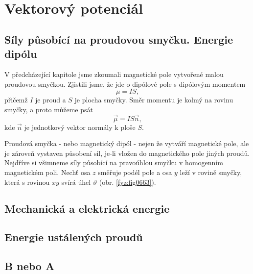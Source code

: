 \setchaptertoc
\chapter{Vektorový potenciál}\label{fyz:IIchapXV}

  \section{Síly působící na proudovou smyčku. Energie dipólu}\label{fyz:IIchapXVsecI}
    V předcházející kapitole jsme zkoumali magnetické pole vytvořené malou proudovou smyč­kou.
    Zjistili jsme, že jde o dipólové pole s dipólovým momentem
    \begin{equation}\label{fyz:eq585}
      \mu = I S,
    \end{equation}
    přičemž \(I\) je proud a \(S\) je plocha smyčky. Směr momentu je kolmý na rovinu smyčky, a proto
    můžeme psát
    \begin{equation}\label{fyz:eq586}
      \vec{\mu} = I S\vec{n},
    \end{equation}
    kde \(\vec{n}\) je jednotkový vektor normály k ploše \(S\).

    Proudová smyčka - nebo magnetický dipól - nejen že vytváří magnetické pole, ale je zároveň
    vystaven působení sil, je-li vložen do magnetického pole jiných proudů. Nejdříve si všimneme
    síly působící na pravoúhlou smyčku v homogenním magnetickém poli. Nechť osa \(z\) směřuje podél
    pole a osa \(y\) leží v rovině smyčky, která s rovinou \(xy\) svírá úhel \(\vartheta\) (obr.
    \ref{fyz:fig0663}). 

  \section{Mechanická a elektrická energie}\label{fyz:IIchapXVsecII}
  \section{Energie ustálených proudů}\label{fyz:IIchapXVsecIII}
  \section{B nebo A}\label{fyz:IIchapXVsecIV}

